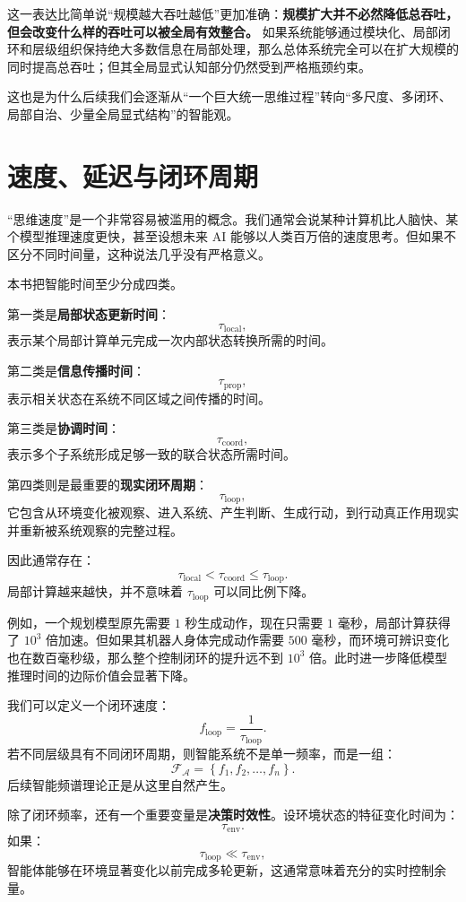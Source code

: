 这一表达比简单说“规模越大吞吐越低”更加准确：\textbf{规模扩大并不必然降低总吞吐，但会改变什么样的吞吐可以被全局有效整合。} 如果系统能够通过模块化、局部闭环和层级组织保持绝大多数信息在局部处理，那么总体系统完全可以在扩大规模的同时提高总吞吐；但其全局显式认知部分仍然受到严格瓶颈约束。

这也是为什么后续我们会逐渐从“一个巨大统一思维过程”转向“多尺度、多闭环、局部自治、少量全局显式结构”的智能观。

\section{速度、延迟与闭环周期}

“思维速度”是一个非常容易被滥用的概念。我们通常会说某种计算机比人脑快、某个模型推理速度更快，甚至设想未来 AI 能够以人类百万倍的速度思考。但如果不区分不同时间量，这种说法几乎没有严格意义。

本书把智能时间至少分成四类。

第一类是\textbf{局部状态更新时间}：
\[
\tau_{\mathrm{local}},
\]
表示某个局部计算单元完成一次内部状态转换所需的时间。

第二类是\textbf{信息传播时间}：
\[
\tau_{\mathrm{prop}},
\]
表示相关状态在系统不同区域之间传播的时间。

第三类是\textbf{协调时间}：
\[
\tau_{\mathrm{coord}},
\]
表示多个子系统形成足够一致的联合状态所需时间。

第四类则是最重要的\textbf{现实闭环周期}：
\[
\tau_{\mathrm{loop}},
\]
它包含从环境变化被观察、进入系统、产生判断、生成行动，到行动真正作用现实并重新被系统观察的完整过程。

因此通常存在：
\[
\boxed{
\tau_{\mathrm{local}}
<
\tau_{\mathrm{coord}}
\leq
\tau_{\mathrm{loop}}.
}
\]
局部计算越来越快，并不意味着 $\tau_{\mathrm{loop}}$ 可以同比例下降。

例如，一个规划模型原先需要 $1$ 秒生成动作，现在只需要 $1$ 毫秒，局部计算获得了 $10^3$ 倍加速。但如果其机器人身体完成动作需要 $500$ 毫秒，而环境可辨识变化也在数百毫秒级，那么整个控制闭环的提升远不到 $10^3$ 倍。此时进一步降低模型推理时间的边际价值会显著下降。

我们可以定义一个闭环速度：
\[
f_{\mathrm{loop}}
=
\frac{1}{\tau_{\mathrm{loop}}}.
\]
若不同层级具有不同闭环周期，则智能系统不是单一频率，而是一组：
\[
\mathcal F_{\mathcal A}
=
\left\{
f_1,f_2,\ldots,f_n
\right\}.
\]
后续智能频谱理论正是从这里自然产生。

除了闭环频率，还有一个重要变量是\textbf{决策时效性}。设环境状态的特征变化时间为：
\[
\tau_{\mathrm{env}}.
\]
如果：
\[
\tau_{\mathrm{loop}}
\ll
\tau_{\mathrm{env}},
\]
智能体能够在环境显著变化以前完成多轮更新，这通常意味着充分的实时控制余量。

